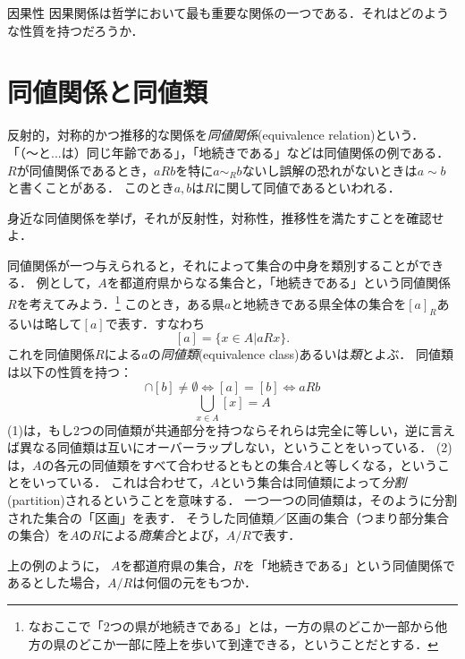 \documentclass[11pt,a4paper]{bxjsarticle}
\begin{document}
\begin{rei}{因果性}{}
 因果関係は哲学において最も重要な関係の一つである．それはどのような性質を持つだろうか．
\end{rei}


\section{同値関係と同値類}
反射的，対称的かつ推移的な関係を\emph{同値関係}(equivalence relation)という．
「（〜と...は）同じ年齢である」，「地続きである」などは同値関係の例である．
$R$が同値関係であるとき，$aRb$を特に$a\sim_R b$ないし誤解の恐れがないときは$a \sim b$と書くことがある．
このとき$a,b$は$R$に関して同値であるといわれる．

\begin{renshu}{}{}
 身近な同値関係を挙げ，それが反射性，対称性，推移性を満たすことを確認せよ．
\end{renshu}

\begin{answer}
 
\end{answer}

同値関係が一つ与えられると，それによって集合の中身を類別することができる．
例として，$A$を都道府県からなる集合と，「地続きである」という同値関係$R$を考えてみよう．\footnote{なおここで「2つの県が地続きである」とは，一方の県のどこか一部から他方の県のどこか一部に陸上を歩いて到達できる，ということだとする．}
このとき，ある県$a$と地続きである県全体の集合を$[a]_R$あるいは略して$[a]$で表す．すなわち
\[
 [a] = \{x \in A | aRx\}.
\]
これを同値関係$R$による$a$の\emph{同値類}(equivalence class)あるいは\emph{類}とよぶ．
同値類は以下の性質を持つ：
\begin{equation}
[a] \cap [b] \neq \emptyset  \iff [a] = [b] \iff aRb
\end{equation}
\begin{equation}
\bigcup_{x \in A} [x] = A
\end{equation}
(1)は，もし2つの同値類が共通部分を持つならそれらは完全に等しい，逆に言えば異なる同値類は互いにオーバーラップしない，ということをいっている．
(2)は，$A$の各元の同値類をすべて合わせるともとの集合$A$と等しくなる，ということをいっている．
これは合わせて，$A$という集合は同値類によって\emph{分割}(partition)されるということを意味する．
一つ一つの同値類は，そのように分割された集合の「区画」を表す．
そうした同値類／区画の集合（つまり部分集合の集合）を$A$の$R$による\emph{商集合}とよび，$A/R$で表す．

\begin{renshu}{}{}
上の例のように， $A$を都道府県の集合，$R$を「地続きである」という同値関係であるとした場合，$A/R$は何個の元をもつか．
\end{renshu}
\end{document}

